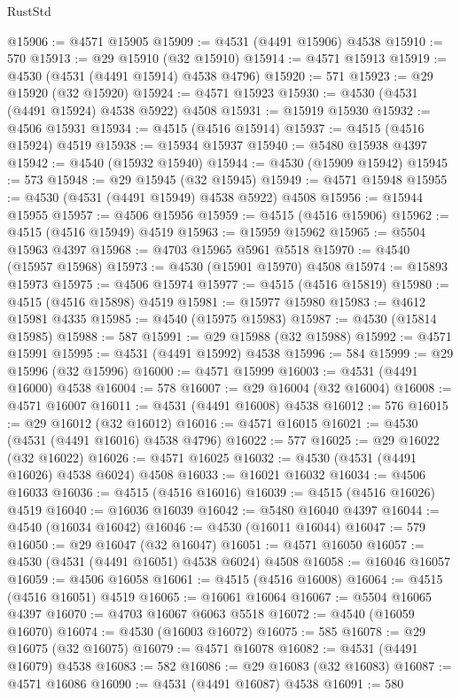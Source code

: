 \begin{lexlean}{RustStd}
\begin{coremodule}
{\begin{coremodule}
{{{{{{{{{{{{{{{{{{{{{{{{{{{{{{{{{{{{{{{{{{{{{{{{{{{{{{{@15906 := @4571 @15905
@15909 := @4531 (@4491 @15906) @4538
@15910 := 570
@15913 := @29 @15910 (@32 @15910)
@15914 := @4571 @15913
@15919 := @4530 (@4531 (@4491 @15914) @4538 @4796)
@15920 := 571
@15923 := @29 @15920 (@32 @15920)
@15924 := @4571 @15923
@15930 := @4530 (@4531 (@4491 @15924) @4538 @5922) @4508
@15931 := @15919 @15930
@15932 := @4506 @15931
@15934 := @4515 (@4516 @15914)
@15937 := @4515 (@4516 @15924) @4519
@15938 := @15934 @15937
@15940 := @5480 @15938 @4397
@15942 := @4540 (@15932 @15940)
@15944 := @4530 (@15909 @15942)
@15945 := 573
@15948 := @29 @15945 (@32 @15945)
@15949 := @4571 @15948
@15955 := @4530 (@4531 (@4491 @15949) @4538 @5922) @4508
@15956 := @15944 @15955
@15957 := @4506 @15956
@15959 := @4515 (@4516 @15906)
@15962 := @4515 (@4516 @15949) @4519
@15963 := @15959 @15962
@15965 := @5504 @15963 @4397
@15968 := @4703 @15965 @5961 @5518
@15970 := @4540 (@15957 @15968)
@15973 := @4530 (@15901 @15970) @4508
@15974 := @15893 @15973
@15975 := @4506 @15974
@15977 := @4515 (@4516 @15819)
@15980 := @4515 (@4516 @15898) @4519
@15981 := @15977 @15980
@15983 := @4612 @15981 @4335
@15985 := @4540 (@15975 @15983)
@15987 := @4530 (@15814 @15985)
@15988 := 587
@15991 := @29 @15988 (@32 @15988)
@15992 := @4571 @15991
@15995 := @4531 (@4491 @15992) @4538
@15996 := 584
@15999 := @29 @15996 (@32 @15996)
@16000 := @4571 @15999
@16003 := @4531 (@4491 @16000) @4538
@16004 := 578
@16007 := @29 @16004 (@32 @16004)
@16008 := @4571 @16007
@16011 := @4531 (@4491 @16008) @4538
@16012 := 576
@16015 := @29 @16012 (@32 @16012)
@16016 := @4571 @16015
@16021 := @4530 (@4531 (@4491 @16016) @4538 @4796)
@16022 := 577
@16025 := @29 @16022 (@32 @16022)
@16026 := @4571 @16025
@16032 := @4530 (@4531 (@4491 @16026) @4538 @6024) @4508
@16033 := @16021 @16032
@16034 := @4506 @16033
@16036 := @4515 (@4516 @16016)
@16039 := @4515 (@4516 @16026) @4519
@16040 := @16036 @16039
@16042 := @5480 @16040 @4397
@16044 := @4540 (@16034 @16042)
@16046 := @4530 (@16011 @16044)
@16047 := 579
@16050 := @29 @16047 (@32 @16047)
@16051 := @4571 @16050
@16057 := @4530 (@4531 (@4491 @16051) @4538 @6024) @4508
@16058 := @16046 @16057
@16059 := @4506 @16058
@16061 := @4515 (@4516 @16008)
@16064 := @4515 (@4516 @16051) @4519
@16065 := @16061 @16064
@16067 := @5504 @16065 @4397
@16070 := @4703 @16067 @6063 @5518
@16072 := @4540 (@16059 @16070)
@16074 := @4530 (@16003 @16072)
@16075 := 585
@16078 := @29 @16075 (@32 @16075)
@16079 := @4571 @16078
@16082 := @4531 (@4491 @16079) @4538
@16083 := 582
@16086 := @29 @16083 (@32 @16083)
@16087 := @4571 @16086
@16090 := @4531 (@4491 @16087) @4538
@16091 := 580
}}}}}}}}}}}}}}}}}}}}}}}}}}}}}}}}}}}}}}}}}}}}}}}}}}}}}}}
\end{coremodule}}
\end{coremodule}
\end{lexlean}
